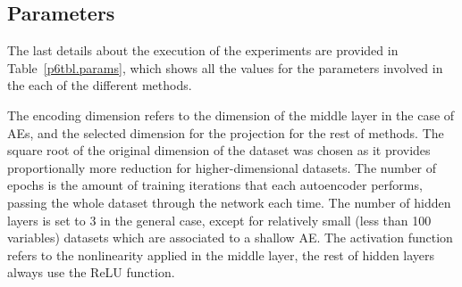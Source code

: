 \subsection{Parameters}

The last details about the execution of the experiments are provided in Table~\ref{p6tbl.params}, which shows all the values for the parameters involved in the each of the different methods.

\begin{table}[ht]
  \centering
  \caption{\label{p6tbl.params}Enumeration of parameters used throughout the experiments.}
\end{table}

\iffalse The encoding dimension refers to the dimension of the middle layer in the case of AEs, and the selected dimension for the projection for the rest of methods. The square root of the original dimension of the dataset was chosen as it provides proportionally more reduction for higher-dimensional datasets.
  The number of epochs is the amount of training iterations that each autoencoder performs, passing the whole dataset through the network each time. The number of hidden layers is set to 3 in the general case, except for relatively small (less than 100 variables) datasets which are associated to a shallow AE. The activation function refers to the nonlinearity applied in the middle layer, the rest of hidden layers always use the ReLU function.

